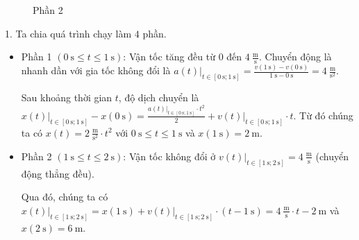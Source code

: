 \documentclass[a4paper, titlepage, openany]{book}
\newcounter{solution}
\begin{document}
\begin{figure}[h]
\begin{minipage}[t]{0.48\textwidth}
      \caption{Phần 2}
      \label{fig:chay_phan_b}
   \end{minipage}
\end{figure}

\solution

1. Ta chia quá trình chạy làm $4$ phần.


\begin{itemize}
   \item Phần 1 $\left(0\ \text{s}\leq t \leq 1\ \text{s}\right)$: Vận tốc tăng đều từ $0$ đến $4\ \frac{\text{m}}{\text{s}}$. Chuyển động là nhanh dần với gia tốc không đổi là $\left.a(t)\right|_{t\in\left[0\ \text{s};1\ \text{s}\right]}=\frac{v(1\ \text{s})-v(0\ \text{s})}{1\ \text{s}-0\ \text{s}}=4\ \frac{\text{m}}{\text{s}^2}$.
   
Sau khoảng thời gian $t$, độ dịch chuyển là $\left.x(t)\right|_{t\in\left[0\ \text{s};1\ \text{s}\right]} - x(0\ \text{s}) = \frac{\left.a(t)\right|_{t\in\left[0\ \text{s};1\ \text{s}\right]}\cdot t^2}{2} + \left.v(t)\right|_{t\in\left[0\ \text{s};1\ \text{s}\right]}\cdot t$. Từ đó chúng ta có $x(t) = 2\ \frac{\text{m}}{\text{s}^2}\cdot t^2$ với $0\ \text{s}\leq t \leq 1\ \text{s}$ và $x(1\ \text{s}) = 2\ \text{m}$.
   
   \item Phần 2 $\left(1\ \text{s}\leq t \leq 2\ \text{s}\right)$: Vận tốc không đổi ở $\left.v(t)\right|_{t\in\left[1\ \text{s};2\ \text{s}\right]} = 4\ \frac{\text{m}}{\text{s}}$ (chuyển động thẳng đều). 
   
Qua đó, chúng ta có $\left.x(t)\right|_{t\in\left[1\ \text{s};2\ \text{s}\right]} = x(1\ \text{s}) + \left.v(t)\right|_{t\in\left[1\ \text{s};2\ \text{s}\right]}\cdot\left(t - 1\ \text{s}\right) = 4\ \frac{\text{m}}{\text{s}}\cdot t - 2\ \text{m}$ và $x(2\ \text{s}) = 6\ \text{m}$.
\end{itemize}
\end{document}

